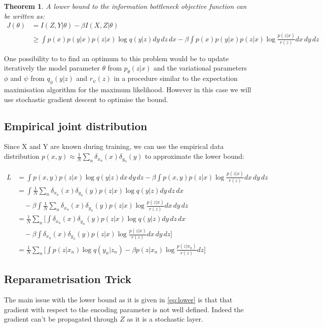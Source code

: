 \documentclass[10pt,oneside,openright]{report}
\newtheorem{theorem}{Theorem}
\begin{document}
\begin{theorem}
A lower bound to the information bottleneck objective function can be written as:
 \begin{align}
J(\theta) &= I(Z, Y|\theta) - \beta I(X, Z|\theta)\\
	      &\geq \int p(x) p(y|x) p(z|x) \log q(y|z) dy\, dz\, dx - \beta   \int p(x)p(y|x)p(z|x) \log \frac{p(z|x)}{r(z)} dx\, dy\, dz
\end{align}
\end{theorem}

One possibility to to find an optimum to this problem would be to update iteratively the model parameter $\theta$ from $p_\theta(z|x)$  and the variational parameters $\phi$ and $\psi$ from $q_\phi(y|z)$ and $r_\psi(z)$ in a procedure similar to the expectation maximisation algorithm for the maximum likelihood. However in this case we will use stochastic gradient descent to optimise the bound.

\subsection{Empirical joint distribution}
Since X and Y are known during training, we can use the empirical data distribution $p(x, y) \approx \frac{1}{N}\sum_n\delta_{x_n}(x)\delta_{y_n}(y)$ to approximate the lower bound:

 \begin{align}
L & = \int p(x, y) p(z|x) \log q(y|z) dx\, dy\, dz - \beta \int p(x, y) p(z|x) \log \frac{p(z|x)}{r(z)}dx\, dy\, dz  \\
   & = \int \frac{1}{N}\sum_n\delta_{x_n}(x)\delta_{y_n}(y) p(z|x) \log q(y|z) dy\, dz\, dx \\ 
   & \quad - \beta  \int \frac{1}{N}\sum_n\delta_{x_n}(x)\delta_{y_n}(y) p(z|x) \log \frac{p(z|x)}{r(z)}dx\, dy\, dz \\
   & = \frac{1}{N}\sum_n \Big[ \int \delta_{x_n}(x)\delta_{y_n}(y) p(z|x) \log q(y|z) dy\, dz\, dx \\
   & \quad - \beta   \int \delta_{x_n}(x)\delta_{y_n}(y) p(z|x) \log \frac{p(z|x)}{r(z)}dx\, dy\, dz \Big] \\
   & = \frac{1}{N}\sum_n \Big[ \int p(z|x_n) \log q(y_n|z_n) - \beta   p(z|x_n) \log \frac{p(z|x_n)}{r(z)} dz \Big] \label{eq:lower}
\end{align}


\subsection{Reparametrisation Trick}
The main issue with the lower bound as it is given in \ref{eq:lower} is that that gradient with respect to the encoding parameter is not well defined. Indeed the gradient can't be propagated through $Z$ as it is a stochastic layer.
\end{document}
